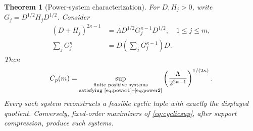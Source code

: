 \documentclass[11pt]{article}
\newtheorem{theorem}{Theorem}[section]
\theoremstyle{remark}\newtheorem{remark}[theorem]{Remark}
\begin{document}
\begin{theorem}[Power-system characterization]\label{thm:power}
For \(D,H_j>0\), write \(G_j=D^{1/2}H_jD^{1/2}\). Consider
\begin{align}
 (D+H_j)^{2\kappa-1}
 &=\Lambda D^{1/2}G_j^{\kappa-1}D^{1/2},\quad 1\le j\le m,
 \label{eq:power1}\\
 \sum_jG_j^\kappa&=D\left(\sum_jG_j^{\kappa-1}\right)D.
 \label{eq:power2}
\end{align}
Then
\begin{equation}\label{eq:powerC}
 C_p(m)=
 \sup_{\substack{\text{finite positive systems}\\\text{satisfying \eqref{eq:power1}--\eqref{eq:power2}}}}
 \left(\frac{\Lambda}{2^{2\kappa-1}}\right)^{1/(2\kappa)}.
\end{equation}
Every such system reconstructs a feasible cyclic tuple with exactly the displayed quotient. Conversely, fixed-order maximizers of \eqref{eq:cyclicsup}, after support compression, produce such systems.
\end{theorem}
\end{document}
